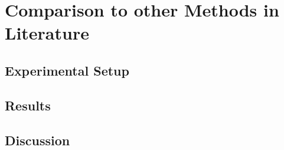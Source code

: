 \documentclass[./../../paper.tex]{subfiles}
\begin{document}
\section{Comparison to other Methods in Literature}

\subsection{Experimental Setup}

\subsection{Results}

\subsection{Discussion}
\end{document}
